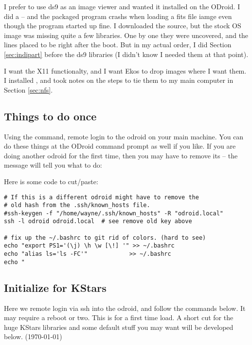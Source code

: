 \documentclass[letter,11pt,oneside]{article}
\newcommand{\dhl}[1]{{\color{verbcolor}{\texttt#1}}}
\begin{document}
I prefer to use ds9 as an image viewer and wanted it installed on the ODroid.
I did a \dhl{sudo apt-get install saods9} -- and the packaged program
crashs when loading a fits file iamge even though the program started up
fine. I downloaded the source, but the stock OS image was missing
quite a few libraries. One by one they were uncovered, and the
\dhl{apt-get install} lines placed to be right after the boot.
But in my actual order, I did Section \ref{sec:indipart} before
the ds9 libraries (I didn't know I needed them at that point).

I want the X11 functionalty, and I want Ekos to drop images where
I want them. I installed \dhl{NFS}, and took notes on the steps
to tie them to my main computer in Section \ref{sec:nfs}.


\subsection{Things to do once}

Using the \dhl{ssh} command, remote login to the odroid on your main
machine. You can do these things at the ODroid command prompt as well
if you like. If you are doing another odroid for the first time, then
you may have to remove its \dhl{ssh-key} -- the message will
tell you what to do:

\hskip 1cm \dhl{   ssh-keygen -f "/home/wayne/.ssh/known\_hosts" -R "odroid.local"}

Here is some code to cut/paste:

\begin{tcolorbox} %
\begingroup \fontsize{10pt}{10pt}
\selectfont
\begin{verbatim} 
# If this is a different odroid might have to remove the
# old hash from the .ssh/known_hosts file.
#ssh-keygen -f "/home/wayne/.ssh/known_hosts" -R "odroid.local"
ssh -l odroid odroid.local  # see remove old key above

# fix up the ~/.bashrc to git rid of colors. (hard to see)
echo "export PS1='(\j) \h \w [\!] '" >> ~/.bashrc
echo "alias ls='ls -FC'"            >> ~/.bashrc
echo "
\end{verbatim}
\endgroup
\end{tcolorbox}

\subsection{Initialize for KStars}

Here we remote login via ssh into the odroid, and follow
the commands below. It may require a reboot or two.
This is for a first time load. A short cut for the
huge KStars libraries and some default stuff you may
want will be developed below. (\today)
\end{document}
